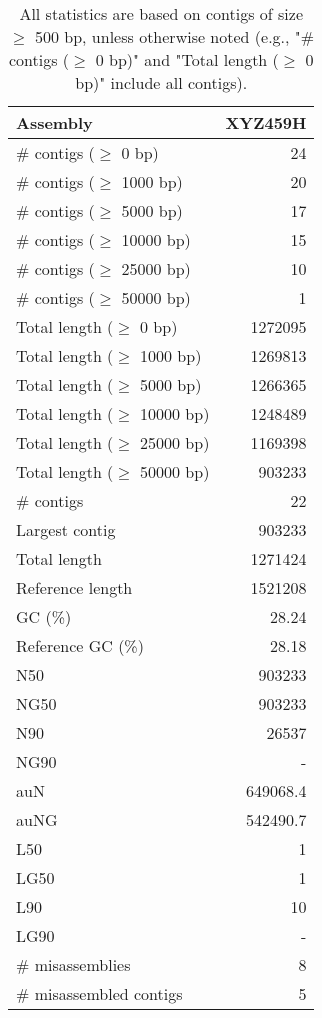 \documentclass[12pt,a4paper]{article}
\begin{document}
\begin{table}[ht]
\begin{center}
\caption{All statistics are based on contigs of size $\geq$ 500 bp, unless otherwise noted (e.g., "\# contigs ($\geq$ 0 bp)" and "Total length ($\geq$ 0 bp)" include all contigs).}
\begin{tabular}{|l*{1}{|r}|}
\hline
Assembly & XYZ459H \\ \hline
\# contigs ($\geq$ 0 bp) & 24 \\ \hline
\# contigs ($\geq$ 1000 bp) & 20 \\ \hline
\# contigs ($\geq$ 5000 bp) & 17 \\ \hline
\# contigs ($\geq$ 10000 bp) & 15 \\ \hline
\# contigs ($\geq$ 25000 bp) & 10 \\ \hline
\# contigs ($\geq$ 50000 bp) & 1 \\ \hline
Total length ($\geq$ 0 bp) & 1272095 \\ \hline
Total length ($\geq$ 1000 bp) & 1269813 \\ \hline
Total length ($\geq$ 5000 bp) & 1266365 \\ \hline
Total length ($\geq$ 10000 bp) & 1248489 \\ \hline
Total length ($\geq$ 25000 bp) & 1169398 \\ \hline
Total length ($\geq$ 50000 bp) & 903233 \\ \hline
\# contigs & 22 \\ \hline
Largest contig & 903233 \\ \hline
Total length & 1271424 \\ \hline
Reference length & 1521208 \\ \hline
GC (\%) & 28.24 \\ \hline
Reference GC (\%) & 28.18 \\ \hline
N50 & 903233 \\ \hline
NG50 & 903233 \\ \hline
N90 & 26537 \\ \hline
NG90 & - \\ \hline
auN & 649068.4 \\ \hline
auNG & 542490.7 \\ \hline
L50 & 1 \\ \hline
LG50 & 1 \\ \hline
L90 & 10 \\ \hline
LG90 & - \\ \hline
\# misassemblies & 8 \\ \hline
\# misassembled contigs & 5 \\ \hline

\end{tabular}
\end{center}
\end{table}
\end{document}
